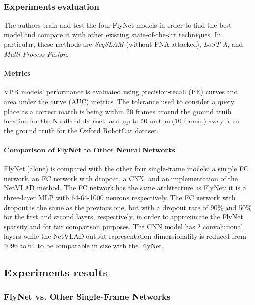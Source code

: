 \subsubsection{Experiments evaluation}\label{header-n208}

The authors train and test the four FlyNet models in order to find the
best model and compare it with other existing state-of-the-art
techniques. In particular, these methods are \emph{SeqSLAM} (without FNA
attacked), \emph{LoST-X}, and \emph{Multi-Process Fusion}.

\paragraph{Metrics}\label{header-n210}

VPR models' performance is evaluated using precision-recall (PR) curves
and area under the curve (AUC) metrics. The tolerance used to consider a
query place as a correct match is being within 20 frames around the
ground truth location for the Nordland dataset, and up to 50 meters (10
frames) away from the ground truth for the Oxford RobotCar dataset.

\paragraph{Comparison of FlyNet to Other Neural
Networks}\label{header-n212}

FlyNet (alone) is compared with the other four single-frame models: a
simple FC network, an FC network with dropout, a CNN, and an
implementation of the NetVLAD method. The FC network has the same
architecture as FlyNet: it is a three-layer MLP with 64-64-1000 neurons
respectively. The FC network with dropout is the same as the previous
one, but with a dropout rate of 90\% and 50\% for the first and second
layers, respectively, in order to approximate the FlyNet sparsity and
for fair comparison purposes. The CNN model has 2 convolutional layers
while the NetVLAD output representation dimensionality is reduced from
4096 to 64 to be comparable in size with the FlyNet.
\newpage
\subsection{Experiments results}\label{header-n214}

\subsubsection{FlyNet vs. Other Single-Frame
Networks}\label{header-n215}

